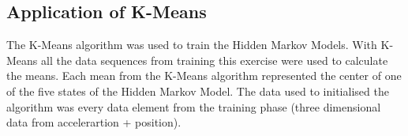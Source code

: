 \subsection{Application of K-Means}
The K-Means algorithm was used to train the Hidden Markov Models. With K-Means all the data sequences from training this exercise were used to calculate the means. Each mean from the K-Means algorithm represented the center of one of the five states of the Hidden Markov Model. The data used to initialised the algorithm was every data element from the training phase (three dimensional data from accelerartion + position).  
